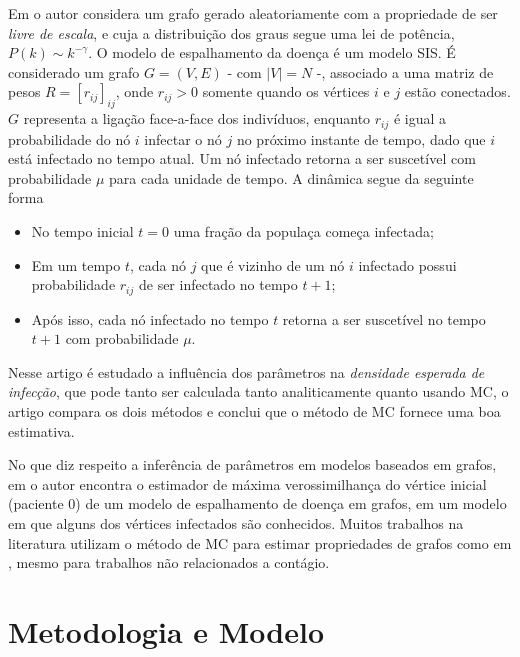\documentclass{article}
\begin{document}
Em \cite{Main} o autor considera um grafo gerado aleatoriamente com a propriedade de ser \textit{livre de escala}, e cuja a distribuição dos graus segue uma lei de potência, $P(k) \sim k^{-\gamma}$. O modelo de espalhamento da doença é um modelo SIS. É considerado um grafo $G = (V, E)$ - com $|V| = N$ -, associado a uma matriz de pesos $R = [r_{ij}]_{ij}$, onde $r_{ij} > 0$ somente quando os vértices $i$ e $j$ estão conectados. $G$ representa a ligação face-a-face dos indivíduos, enquanto $r_{ij}$ é igual a probabilidade do nó $i$ infectar o nó $j$ no próximo instante de tempo, dado que $i$ está infectado no tempo atual. Um nó infectado retorna a ser suscetível com probabilidade $\mu$ para cada unidade de tempo. A dinâmica segue da seguinte forma

\begin{itemize}
    \item No tempo inicial $t = 0$ uma fração da populaça começa infectada;
    \item Em um tempo $t$, cada nó $j$ que é vizinho de um nó $i$ infectado possui probabilidade $r_{ij}$ de ser infectado no tempo $t+1$;
    \item Após isso, cada nó infectado no tempo $t$ retorna a ser suscetível no tempo $t+1$ com probabilidade $\mu$.
\end{itemize}

Nesse artigo é estudado a influência dos parâmetros na \textit{densidade esperada de infecção}, que pode tanto ser calculada tanto analiticamente quanto usando MC, o artigo compara os dois métodos e conclui que o método de MC fornece uma boa estimativa.

No que diz respeito a inferência de parâmetros em modelos baseados em grafos, em \cite{EMV} o autor encontra o estimador de máxima verossimilhança do vértice inicial (paciente 0) de um modelo de espalhamento de doença em grafos, em um modelo em que alguns dos vértices infectados são conhecidos. Muitos trabalhos na literatura utilizam o método de MC para estimar propriedades de grafos como em \cite{estimatingpath}, mesmo para trabalhos não relacionados a contágio. 


\section{Metodologia e Modelo}
\end{document}
